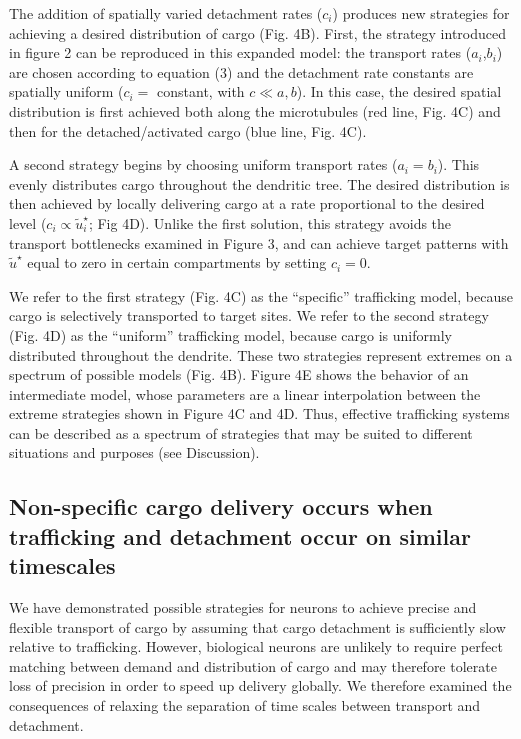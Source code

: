 \documentclass[11pt]{wlpeerj}
\begin{document}
The addition of spatially varied detachment rates ($c_i$) produces new strategies for achieving a desired distribution of cargo (Fig. 4B).
First, the strategy introduced in figure 2 can be reproduced in this expanded model: the transport rates ($a_i$,$b_i$) are chosen according to equation (3) and the detachment rate constants are spatially uniform ($c_i =$ constant, with $c \ll a,b$).
In this case, the desired spatial distribution is first achieved both along the microtubules (red line, Fig. 4C) and then for the detached/activated cargo (blue line, Fig. 4C).

A second strategy begins by choosing uniform transport rates ($a_i = b_i$). This evenly distributes cargo throughout the dendritic tree. The desired distribution is then achieved by locally delivering cargo at a rate proportional to the desired level ($c_i \propto \tilde{u}^\star_i$; Fig 4D). Unlike the first solution, this strategy avoids the transport bottlenecks examined in Figure 3, and can achieve target patterns with $\tilde{u}^\star$ equal to zero in certain compartments by setting $c_i = 0$. 

We refer to the first strategy (Fig. 4C) as the ``specific'' trafficking model, because cargo is selectively transported to target sites.
We refer to the second strategy (Fig. 4D) as the ``uniform'' trafficking model, because cargo is uniformly distributed throughout the dendrite.
These two strategies represent extremes on a spectrum of possible models (Fig. 4B).
Figure 4E shows the behavior of an intermediate model, whose parameters are a linear interpolation between the extreme strategies shown in Figure 4C and 4D.
Thus, effective trafficking systems can be described as a spectrum of strategies that may be suited to different situations and purposes (see Discussion). 

\subsection*{Non-specific cargo delivery occurs when trafficking and detachment occur on similar timescales}

We have demonstrated possible strategies for neurons to achieve precise and flexible transport of cargo by assuming that cargo detachment is sufficiently slow relative to trafficking.
However, biological neurons are unlikely to require perfect matching between demand and distribution of cargo and may therefore tolerate loss of precision in order to speed up delivery globally.
We therefore examined the consequences of relaxing the separation of time scales between transport and detachment.
\end{document}
